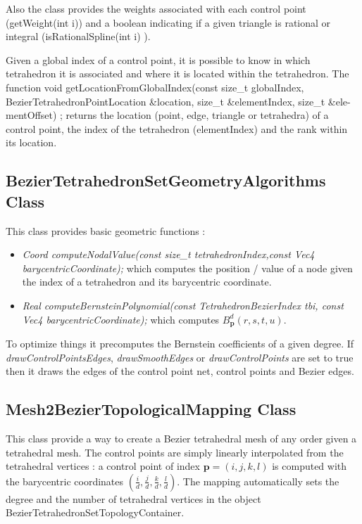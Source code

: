 \documentclass[a4paper,11pt]{article}
\newcommand{\degree}{{d}}
\begin{document}
Also the class provides the weights associated with each control point (getWeight(int i)) and
a boolean indicating if a given triangle is rational or integral (isRationalSpline(int i) ).


Given a global index of a control point, it is possible to know in which tetrahedron it is associated
and where it is located within the tetrahedron. The function void getLocationFromGlobalIndex(const
size\_t globalIndex, BezierTetrahedronPointLocation \&location, size\_t \&elementIndex, size\_t \&ele-
mentOffset) ; returns the location (point, edge, triangle or tetrahedra) of a control point, the index of the
tetrahedron (elementIndex) and the rank within its location.

\subsection{BezierTetrahedronSetGeometryAlgorithms Class}

This class provides basic geometric functions :

\begin{itemize}
	\item {\it Coord computeNodalValue(const size\_t tetrahedronIndex,const Vec4 barycentricCoordinate); } which computes the position / value of a node given the index of a tetrahedron and its barycentric coordinate.
	\item {\it Real computeBernsteinPolynomial(const TetrahedronBezierIndex tbi, const Vec4 barycentricCoordinate);} which computes $B^d_{\mathbf p}(r,s,t,u)$.
\end{itemize}

To optimize things it precomputes the Bernstein coefficients of a given degree. If {\it drawControlPointsEdges},  {\it drawSmoothEdges}  or  {\it drawControlPoints} are set to true then it draws the edges of the control point net, control points and Bezier edges.  

\subsection{Mesh2BezierTopologicalMapping Class}

This class provide a way to create a Bezier tetrahedral mesh of any order given a tetrahedral mesh. The control points are simply linearly interpolated from the tetrahedral vertices : a control point of index ${\mathbf p}=(i,j,k,l)$ is computed with the barycentric coordinates $(\frac{i}{\degree},\frac{j}{\degree},\frac{k}{\degree},\frac{l}{\degree})$. The mapping automatically sets the degree and the number of tetrahedral vertices in the object BezierTetrahedronSetTopologyContainer.
\end{document}
